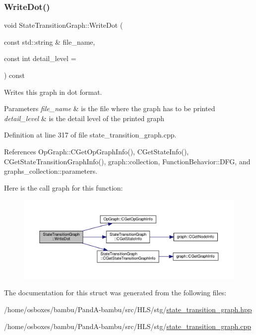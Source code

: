\subsubsection{\texorpdfstring{Write\+Dot()}{WriteDot()}}
{\footnotesize\ttfamily void State\+Transition\+Graph\+::\+Write\+Dot (\begin{DoxyParamCaption}\item[{const std\+::string \&}]{file\+\_\+name,  }\item[{const int}]{detail\+\_\+level = {} }\end{DoxyParamCaption}) const}



Writes this graph in dot format. 


\begin{DoxyParams}{Parameters}
{\em file\+\_\+name} & is the file where the graph has to be printed \\
\hline
{\em detail\+\_\+level} & is the detail level of the printed graph \\
\hline
\end{DoxyParams}


Definition at line 317 of file state\+\_\+transition\+\_\+graph.\+cpp.



References Op\+Graph\+::\+C\+Get\+Op\+Graph\+Info(), C\+Get\+State\+Info(), C\+Get\+State\+Transition\+Graph\+Info(), graph\+::collection, Function\+Behavior\+::\+D\+FG, and graphs\+\_\+collection\+::parameters.

Here is the call graph for this function\+:
\nopagebreak
\begin{figure}[H]
\begin{center}
\leavevmode
\includegraphics[width=350pt]{d9/d86/structStateTransitionGraph_af5933c5e1580fc618df655dd2c0078e2_cgraph}
\end{center}
\end{figure}


The documentation for this struct was generated from the following files\+:\begin{DoxyCompactItemize}
\item 
/home/osboxes/bambu/\+Pand\+A-\/bambu/src/\+H\+L\+S/stg/\hyperlink{state__transition__graph_8hpp}{state\+\_\+transition\+\_\+graph.\+hpp}\item 
/home/osboxes/bambu/\+Pand\+A-\/bambu/src/\+H\+L\+S/stg/\hyperlink{state__transition__graph_8cpp}{state\+\_\+transition\+\_\+graph.\+cpp}\end{DoxyCompactItemize}
